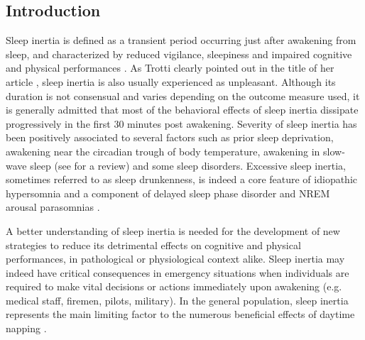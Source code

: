 
\subsection*{Introduction}
\label{res:inertia:inertia:intro}

Sleep inertia is defined as a transient period occurring just after awakening from sleep, and characterized by reduced vigilance, sleepiness and impaired cognitive and physical performances \citep{tassi_sleep_2000, trotti_waking_2016}. As Trotti clearly pointed out in the title of her article , sleep inertia is also usually experienced as unpleasant. Although its duration is not consensual and varies depending on the outcome measure used, it is generally admitted that most of the behavioral effects of sleep inertia dissipate progressively in the first 30 minutes post awakening. Severity of sleep inertia has been positively associated to several factors such as prior sleep deprivation, awakening near the circadian trough of body temperature, awakening in slow-wave sleep (see \citet{tassi_sleep_2000} for a review) and some sleep disorders. Excessive sleep inertia, sometimes referred to as sleep drunkenness, is indeed a core feature of idiopathic hypersomnia and a component of delayed sleep phase disorder and NREM arousal parasomnias \citep{trotti_waking_2016}.

A better understanding of sleep inertia is needed for the development of new strategies to reduce its detrimental effects on cognitive and physical performances, in pathological or physiological context alike. Sleep inertia may indeed have critical consequences in emergency situations when individuals are required to make vital decisions or actions immediately upon awakening (e.g. medical staff, firemen, pilots, military). In the general population, sleep inertia represents the main limiting factor to the numerous beneficial effects of daytime napping \citep{faraut_napping:_2016}.

